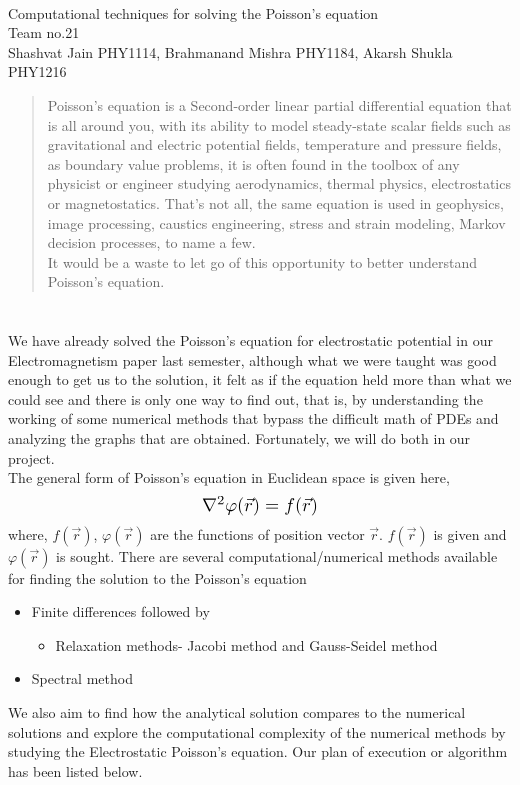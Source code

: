 \documentclass[letterpaper,11pt]{article}
\newcommand{\newsection}[1]{\section{\sffamily{\bfseries{#1}}}}
\begin{document}
	\begin{center}
		 \\[4mm]
		\large{ Computational techniques for solving the Poisson’s equation} \\[4mm]
		\large{\textcolor{greyish}{Team no.21}} \\[1mm]
		\large{\textcolor{greyish}{Shashvat Jain PHY1114, Brahmanand Mishra PHY1184, Akarsh Shukla PHY1216}}\\[3mm]
		\begin{abstract}
			\noindent
			Poisson's equation is a Second-order linear partial differential equation that is all around you, with its ability to model steady-state scalar fields such as gravitational and electric potential fields, temperature and pressure fields, as boundary value problems, it is often found in the toolbox of any physicist or engineer studying aerodynamics, thermal physics, electrostatics or magnetostatics. That’s not all, the same equation is used in geophysics, image processing, caustics engineering, stress and strain modeling, Markov decision processes, to name a few.\\ \noindent
			It would be a waste to let go of this opportunity to better understand Poisson's equation.  
		\end{abstract}	
	\end{center}
	
	\newsection{PROJECT SYNOPSIS}
	\noindent
	We have already solved the Poisson’s equation for electrostatic potential in our Electromagnetism paper last semester, although what we were taught was good enough to get us to the solution, it felt as if the equation held more than what we could see and there is only one way to find out, that is, by understanding the working of some numerical methods that bypass the difficult math of PDEs and analyzing the graphs that are obtained. Fortunately, we will do both in our project.\\
	The general form of Poisson's equation in Euclidean space is given here,
	\[
		\scalebox{1.3}{$\nabla^2 \varphi(\vec{r}) = f(\vec{r})$}
	\]
	where, $f(\vec{r})$, $\varphi(\vec{r})$ are the functions of position vector $\vec{r}$. $f(\vec{r})$ is given and $\varphi(\vec{r})$ is sought. 
	\noindent
	There are several computational/numerical methods available for finding the solution to the Poisson's equation 
	\begin{itemize}
		\setlength\itemsep{0.01mm}
		\item Finite differences followed by 
		\begin{itemize}
			\item Relaxation methods- Jacobi method and Gauss-Seidel method
		\end{itemize}
		\item Spectral method 
	\end{itemize}
	\noindent
	We also aim to find how the analytical solution compares to the numerical solutions and explore the computational complexity of the numerical methods by studying the Electrostatic Poisson’s equation. Our plan of execution or algorithm has been listed below. 
	
\end{document}

